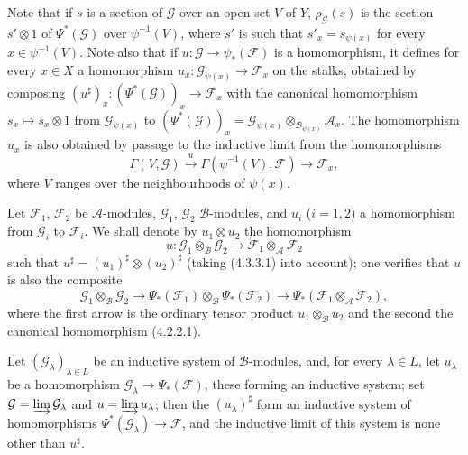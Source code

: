 \begin{env}[4.4.3]
Note that if $s$ is a section of $\mathcal{G}$ over an open set
$V$ of $Y$, $\rho_{\mathcal{G}}(s)$ is the section $s'\otimes1$ of
$\Psi^*(\mathcal{G})$ over $\psi^{-1}(V)$, where $s'$ is such that
$s'_x=s_{\psi(x)}$ for every $x\in\psi^{-1}(V)$. Note also that if
$u:\mathcal{G}\to\psi_*(\mathcal{F})$ is a homomorphism, it defines for
every $x\in X$ a homomorphism
$u_x:\mathcal{G}_{\psi(x)}\to\mathcal{F}_x$ on the stalks, obtained by
composing
$(u^\sharp)_x:(\Psi^*(\mathcal{G}))_x\to\mathcal{F}_x$ with the canonical
homomorphism $s_x\mapsto s_x\otimes1$ from $\mathcal{G}_{\psi(x)}$ to
$(\Psi^*(\mathcal{G}))_x
=\mathcal{G}_{\psi(x)}\otimes_{\mathcal{B}_{\psi(x)}}\mathcal{A}_x$.
The homomorphism $u_x$ is also obtained by passage to the inductive limit
from the homomorphisms
\[
  \Gamma(V,\mathcal{G})\xrightarrow{u}
  \Gamma(\psi^{-1}(V),\mathcal{F})\longrightarrow\mathcal{F}_x,
\]
where $V$ ranges over the neighbourhoods of $\psi(x)$.
\end{env}

\begin{env}[4.4.4]
\label{0.4.4.4}
Let $\mathcal{F}_1$, $\mathcal{F}_2$ be $\mathcal{A}$-modules,
$\mathcal{G}_1$, $\mathcal{G}_2$ $\mathcal{B}$-modules, and $u_i$ ($i=1,2$)
a homomorphism from $\mathcal{G}_i$ to $\mathcal{F}_i$. We shall denote by
$u_1\otimes u_2$ the homomorphism
\[
  u:\mathcal{G}_1\otimes_{\mathcal{B}}\mathcal{G}_2
  \longrightarrow
  \mathcal{F}_1\otimes_{\mathcal{A}}\mathcal{F}_2
\]
such that $u^\sharp=(u_1)^\sharp\otimes(u_2)^\sharp$ (taking
(4.3.3.1) into account); one verifies that $u$ is also the composite
\[
  \mathcal{G}_1\otimes_{\mathcal{B}}\mathcal{G}_2
  \longrightarrow
  \Psi_*(\mathcal{F}_1)\otimes_{\mathcal{B}}\Psi_*(\mathcal{F}_2)
  \longrightarrow
  \Psi_*(\mathcal{F}_1\otimes_{\mathcal{A}}\mathcal{F}_2),
\]
where the first arrow is the ordinary tensor product
$u_1\otimes_{\mathcal{B}}u_2$ and the second the canonical homomorphism
(4.2.2.1).
\end{env}

\begin{env}[4.4.5]
\label{0.4.4.5}
Let $(\mathcal{G}_\lambda)_{\lambda\in L}$ be an inductive system of
$\mathcal{B}$-modules, and, for every $\lambda\in L$, let $u_\lambda$ be a
homomorphism $\mathcal{G}_\lambda\to\Psi_*(\mathcal{F})$, these forming an
inductive system; set
$\mathcal{G}=\varinjlim\mathcal{G}_\lambda$ and
$u=\varinjlim u_\lambda$; then the $(u_\lambda)^\sharp$ form an
inductive system of homomorphisms $\Psi^*(\mathcal{G}_\lambda)\to\mathcal{F}$, and the
inductive limit of this system is none other than $u^\sharp$.
\end{env}

